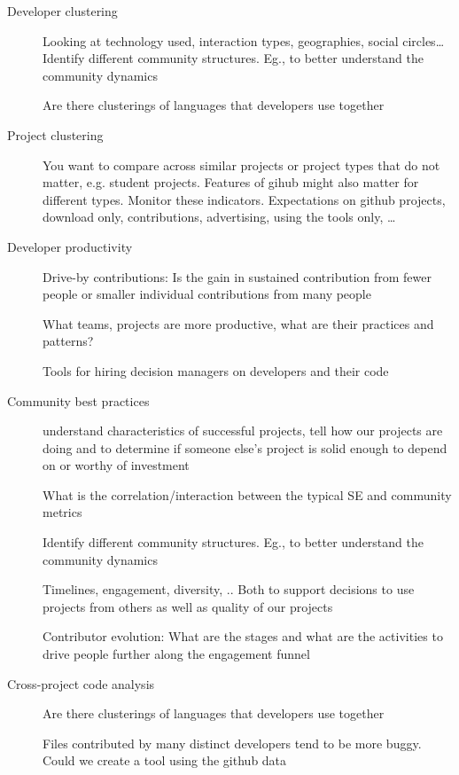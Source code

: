 \documentclass{sig-alternate}
\begin{document}
\begin{description}

  \item[Developer clustering] Looking at technology used, interaction types, geographies, social circles…
    Identify different community structures.  Eg., to better understand the community dynamics

    Are there clusterings of languages that developers use together


  \item[Project clustering]

    You want to compare across similar projects or project types that do not matter, e.g. student projects. Features of gihub might also matter for different types. Monitor these indicators.
Expectations on github projects, download only, contributions, advertising, using the tools only, …


  \item[Developer productivity] Drive-by contributions: Is the gain in sustained contribution from fewer people or smaller individual contributions from many people

  What teams, projects are more productive, what are their practices and patterns?

Tools for hiring decision managers on developers and their code


  \item[Community best practices]

understand characteristics of successful projects, tell how our projects are doing and to determine if someone else’s project is solid enough to depend on or worthy of investment

What is the correlation/interaction between the typical SE and community metrics

Identify different community structures.  Eg., to better understand the community dynamics

Timelines, engagement, diversity, .. Both to support decisions to use projects from others as well as quality of our projects

Contributor evolution: What are the stages and what are the activities to drive people further along the engagement funnel


  \item[Cross-project code analysis]
Are there clusterings of languages that developers use together

Files contributed by many distinct developers tend to be more buggy.  Could we create a tool using the github data


\end{description}
\end{document}
